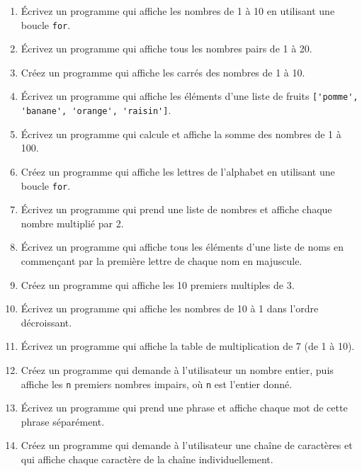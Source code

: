 
\begin{enumerate}

    \item Écrivez un programme qui affiche les nombres de 1 à 10 en utilisant une boucle \lstinline{for}.

    \item Écrivez un programme qui affiche tous les nombres pairs de 1 à 20.

    \item Créez un programme qui affiche les carrés des nombres de 1 à 10.

    \item Écrivez un programme qui affiche les éléments d'une liste de fruits \lstinline{['pomme', 'banane', 'orange', 'raisin']}.

    \item Écrivez un programme qui calcule et affiche la somme des nombres de 1 à 100.

    \item Créez un programme qui affiche les lettres de l'alphabet en utilisant une boucle \lstinline{for}.

    \item Écrivez un programme qui prend une liste de nombres et affiche chaque nombre multiplié par 2.

    \item Écrivez un programme qui affiche tous les éléments d'une liste de noms en commençant par la première lettre de chaque nom en majuscule.

    \item Créez un programme qui affiche les 10 premiers multiples de 3.

    \item Écrivez un programme qui affiche les nombres de 10 à 1 dans l'ordre décroissant.

    \item Écrivez un programme qui affiche la table de multiplication de 7 (de 1 à 10).

    \item Créez un programme qui demande à l'utilisateur un nombre entier, puis affiche les \lstinline{n} premiers nombres impairs, où \lstinline{n} est l'entier donné.

    \item Écrivez un programme qui prend une phrase et affiche chaque mot de cette phrase séparément.

    \item Créez un programme qui demande à l'utilisateur une chaîne de caractères et qui affiche chaque caractère de la chaîne individuellement.


\end{enumerate}
